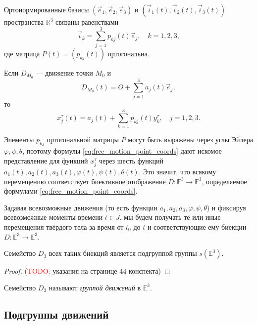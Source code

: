 Ортонормированные базисы $(\vec{e}_1, \vec{e}_2, \vec{e}_3)$ и $(\vec{i}_1(t),
\vec{i}_2(t), \vec{i}_3(t))$ пространства $\mathbb{R}^3$ связаны равенствами
\begin{equation}
  \vec{i}_k = \sum_{j=1}^{3} p_{kj}(t) \vec{e}_j, \quad k = 1,2,3,
\end{equation}
где матрица $P(t) = (p_{kj}(t))$ ортогональна.

Если $D_{M_0}$ --- движение точки $M_0$ и
\begin{equation*}
  D_{M_0}(t) = O + \sum_{j=1}^{3} a_j(t) \vec{e}_j,
\end{equation*}
то
\begin{equation}
  \label{eq:free_motion_point_coords}
  x_j^\tau(t) = a_j(t) + \sum_{k=1}^{3} p_{kj}(t) y_k^\tau, \quad j = 1,2,3.
\end{equation}

Элементы $p_{kj}$ ортогональной матрицы $P$ могут быть выражены через углы
Эйлера $\varphi, \psi, \theta$, поэтому формулы
\ref{eq:free_motion_point_coords} дают искомое представление для функций
$x_j^\tau$ через шесть функций $a_1(t), a_2(t), a_3(t), \varphi(t), \psi(t),
\theta(t)$. Это значит, что всякому перемещению соответствует биективное
отображение $D : \mathbb{E}^3 \to \mathbb{E}^3$, определяемое формулами
\ref{eq:free_motion_point_coords}.

Задавая всевозможные движения (то есть функции $a_1, a_2, a_3, \varphi, \psi,
\theta$) и фиксируя всевозможные моменты времени $t \in J$, мы будем получать те
или иные перемещения твёрдого тела за время от $t_0$ до $t$ и соответствующие
ему биекции $D : \mathbb{E}^3 \to \mathbb{E}^3$.

\begin{theorem}
  Семейство $D_3$ всех таких биекций является подгруппой группы
  $s(\mathbb{E}^3)$.
\end{theorem}

\begin{proof}
  (\textcolor{red}{TODO:} указания на странице 44 конспекта)
\end{proof}

\begin{definition}
  Семейство $D_3$ называют \textit{группой движений} в $\mathbb{E}^3$.
\end{definition}

\subsection{Подгруппы движений}

